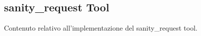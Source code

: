 \subsection{sanity\_request Tool}

Contenuto relativo all'implementazione del sanity\_request tool.
